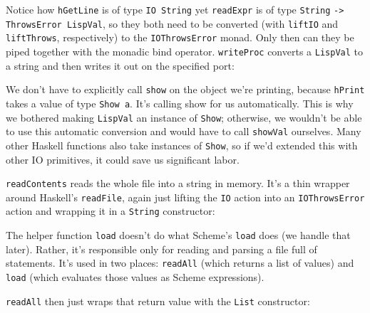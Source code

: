  
Notice how \verb|hGetLine| is of type \verb|IO String| yet \verb|readExpr| is of type \verb|String| \verb|-> ThrowsError LispVal|, so they both need to be converted (with \verb|liftIO| and \verb|liftThrows|, respectively) to the \verb|IOThrowsError| monad. Only then can they be piped together with the monadic bind operator. \verb|writeProc| converts a \verb|LispVal| to a string and then writes it out on the specified port:
 
 
We don't have to explicitly call \verb|show| on the object we're printing, because \verb|hPrint| takes a value of type \verb|Show a|. It's calling show for us automatically. This is why we bothered making \verb|LispVal| an instance of \verb|Show|; otherwise, we wouldn't be able to use this automatic conversion and would have to call \verb|showVal| ourselves. Many other Haskell functions also take instances of \verb|Show|, so if we'd extended this with other IO primitives, it could save us significant labor.
 
\verb|readContents| reads the whole file into a string in memory. It's a thin wrapper around Haskell's \verb|readFile|, again just lifting the \verb|IO| action into an \verb|IOThrowsError| action and wrapping it in a \verb|String| constructor:
 
 
The helper function \verb|load| doesn't do what Scheme's \verb|load| does (we handle that later). Rather, it's responsible only for reading and parsing a file full of statements. It's used in two places: \verb|readAll| (which returns a list of values) and \verb|load| (which evaluates those values as Scheme expressions).
 
 
\verb|readAll| then just wraps that return value with the \verb|List| constructor:
 
